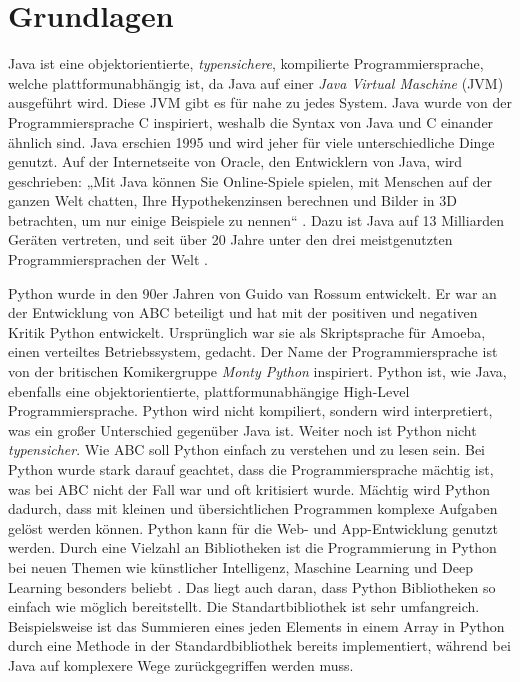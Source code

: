 \newcommand{\code}[1]{\texttt{#1}}

\chapter{Grundlagen}

Java ist eine objektorientierte, \textit{typensichere}, kompilierte Programmiersprache, welche plattformunabhängig ist, da Java auf einer \textit{Java Virtual Maschine} (JVM) ausgeführt wird. Diese JVM gibt es für nahe zu jedes System. Java wurde von der Programmiersprache C inspiriert, weshalb die Syntax von Java und C einander ähnlich sind. Java erschien 1995 und wird jeher für viele unterschiedliche Dinge genutzt. Auf der Internetseite von Oracle, den Entwicklern von Java, wird geschrieben: „Mit Java können Sie Online-Spiele spielen, mit Menschen auf der ganzen Welt chatten, Ihre Hypothekenzinsen berechnen und Bilder in 3D betrachten, um nur einige Beispiele zu nennen“ \cite{Oracle:Java}. Dazu ist Java auf 13 Milliarden Geräten vertreten, und seit über 20 Jahre unter den drei meistgenutzten Programmiersprachen der Welt \cite{Github:PYPL}. \cite{Louis:2010}\cite{Oracle:Twitter} \par
Python wurde in den 90er Jahren von Guido van Rossum entwickelt. Er war an der Entwicklung von ABC beteiligt und hat mit der positiven und negativen Kritik Python entwickelt. Ursprünglich war sie als Skriptsprache für Amoeba, einen verteiltes Betriebssystem, gedacht. Der Name der Programmiersprache ist von der britischen Komikergruppe \textit{Monty Python} inspiriert. Python ist, wie Java, ebenfalls eine objektorientierte, plattformunabhängige High-Level Programmiersprache. Python wird nicht kompiliert, sondern wird interpretiert, was ein großer Unterschied gegenüber Java ist. Weiter noch ist Python nicht \textit{typensicher}. Wie ABC soll Python einfach zu verstehen und zu lesen sein. Bei Python wurde stark darauf geachtet, dass die Programmiersprache mächtig ist, was bei ABC nicht der Fall war und oft kritisiert wurde. Mächtig wird Python dadurch, dass mit kleinen und übersichtlichen Programmen komplexe Aufgaben gelöst werden können. Python kann für die Web- und App-Entwicklung genutzt werden. Durch eine Vielzahl an Bibliotheken ist die Programmierung in Python bei neuen Themen wie künstlicher Intelligenz, Maschine Learning und Deep Learning besonders beliebt \cite{PythonCS}. Das liegt auch daran, dass Python Bibliotheken so einfach wie möglich bereitstellt. Die Standartbibliothek ist sehr umfangreich. Beispielsweise ist das Summieren eines jeden Elements in einem Array in Python durch eine Methode in der Standardbibliothek bereits implementiert, während bei Java auf komplexere Wege zurückgegriffen werden muss. \cite{Python3:Buch}


